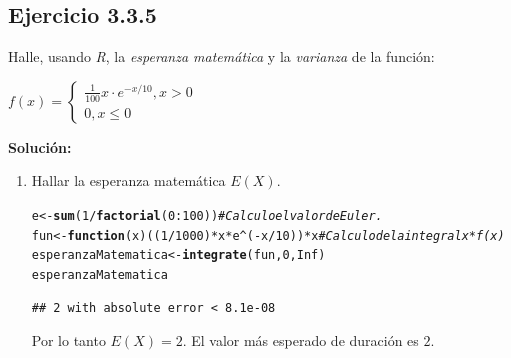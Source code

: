 \documentclass{article}\usepackage[]{graphicx}\usepackage[]{color}
\makeatletter
\newcommand{\hlnum}[1]{\textcolor[rgb]{0.686,0.059,0.569}{#1}}%
\newcommand{\hlcom}[1]{\textcolor[rgb]{0.678,0.584,0.686}{\textit{#1}}}%
\newcommand{\hlopt}[1]{\textcolor[rgb]{0,0,0}{#1}}%
\newcommand{\hlstd}[1]{\textcolor[rgb]{0.345,0.345,0.345}{#1}}%
\newcommand{\hlkwa}[1]{\textcolor[rgb]{0.161,0.373,0.58}{\textbf{#1}}}%
\newcommand{\hlkwb}[1]{\textcolor[rgb]{0.69,0.353,0.396}{#1}}%
\newcommand{\hlkwc}[1]{\textcolor[rgb]{0.333,0.667,0.333}{#1}}%
\newcommand{\hlkwd}[1]{\textcolor[rgb]{0.737,0.353,0.396}{\textbf{#1}}}%
\newenvironment{kframe}{%
 \def\at@end@of@kframe{}%
 \ifinner\ifhmode%
  \def\at@end@of@kframe{\end{minipage}}%
  \begin{minipage}{\columnwidth}%
 \fi\fi%
 \def\FrameCommand##1{\hskip\@totalleftmargin \hskip-\fboxsep
 \colorbox{shadecolor}{##1}\hskip-\fboxsep
     \hskip-\linewidth \hskip-\@totalleftmargin \hskip\columnwidth}%
 \MakeFramed {\advance\hsize-\width
   \@totalleftmargin\z@ \linewidth\hsize
   \@setminipage}}%
 {\par\unskip\endMakeFramed%
 \at@end@of@kframe}
\newenvironment{knitrout}{}{} %
\makeatother
\begin{document}
\subsection{Ejercicio 3.3.5} Halle, usando \textit{R}, la \textit{esperanza matem\'atica} y la \textit{varianza} de la funci\'on:
\begin{center}
$f(x) = \begin{cases} \frac{1}{100}x \cdot e^{-x/10} ,x > 0 \\ 0, x\leq 0 \end{cases}$
\end{center}
\textbf{Soluci\'on:}
\begin{enumerate}
\item Hallar la esperanza matem\'atica $E(X)$.
\begin{knitrout}
\color{fgcolor}\begin{kframe}
\begin{alltt}
\hlstd{e} \hlkwb{<-} \hlkwd{sum}\hlstd{(}\hlnum{1}\hlopt{/}\hlkwd{factorial}\hlstd{(}\hlnum{0}\hlopt{:}\hlnum{100}\hlstd{))} \hlcom{#Calculo el valor de Euler.}
\hlstd{fun} \hlkwb{<-} \hlkwa{function}\hlstd{(}\hlkwc{x}\hlstd{) ((}\hlnum{1}\hlopt{/}\hlnum{1000}\hlstd{)}\hlopt{*}\hlstd{x}\hlopt{*}\hlstd{e}\hlopt{^}\hlstd{(}\hlopt{-}\hlstd{x}\hlopt{/}\hlnum{10}\hlstd{))}\hlopt{*}\hlstd{x} \hlcom{#Calculo de la integral x*f(x)}
\hlstd{esperanzaMatematica} \hlkwb{<-} \hlkwd{integrate}\hlstd{(fun,} \hlnum{0}\hlstd{,} \hlnum{Inf}\hlstd{)}
\hlstd{esperanzaMatematica}
\end{alltt}
\begin{verbatim}
## 2 with absolute error < 8.1e-08
\end{verbatim}
\end{kframe}
\end{knitrout}
Por lo tanto $E(X)=2$. El valor m\'as esperado de duraci\'on es $2$.


\end{enumerate}
\end{document}
